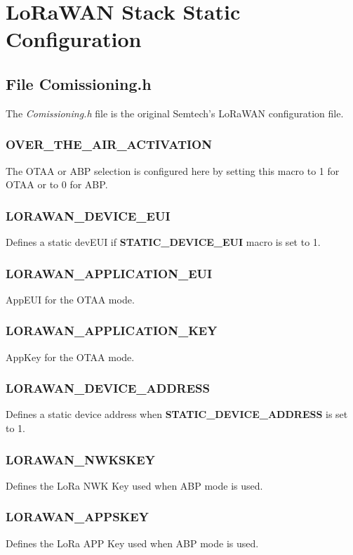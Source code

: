 \documentclass[twoside,a4paper]{refart}
\begin{document}
\clearpage
\section{LoRaWAN Stack Static Configuration}

\subsection{File Comissioning.h}
The {\it Comissioning.h} file is the original Semtech's LoRaWAN configuration file. 

\subsubsection{OVER\_THE\_AIR\_ACTIVATION}
The OTAA or ABP selection is configured here by setting this macro to 1 for OTAA or to 0 for ABP.

\subsubsection{LORAWAN\_DEVICE\_EUI} 
Defines a static devEUI if {\bf STATIC\_DEVICE\_EUI} macro is set to 1.

\subsubsection{LORAWAN\_APPLICATION\_EUI}
AppEUI for the OTAA mode.

\subsubsection{LORAWAN\_APPLICATION\_KEY} 
AppKey for the OTAA mode.

\subsubsection{LORAWAN\_DEVICE\_ADDRESS} 
Defines a static device address when {\bf STATIC\_DEVICE\_ADDRESS} is set to 1.

\subsubsection{LORAWAN\_NWKSKEY}
Defines the LoRa NWK Key used when ABP mode is used.

\subsubsection{LORAWAN\_APPSKEY} 
Defines the LoRa APP Key used when ABP mode is used.
\end{document}
